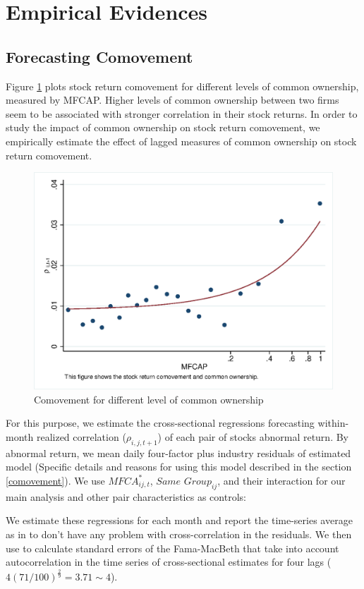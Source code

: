 
\section{Empirical Evidences}



\subsection{{Forecasting Comovement}}
\label{Forecasting Comovement}

	Figure \ref{mcorr50} plots stock return comovement for different levels of common ownership, measured by MFCAP.  Higher levels of common	ownership between two firms seem to be associated with stronger correlation in their stock returns. In order to study the impact of common ownership on stock return comovement, we empirically estimate the effect of lagged measures of common ownership on stock return comovement. 
	\begin{figure}[htbp]
	\centering  
	\centering
	\includegraphics[width=0.7\linewidth]{"Output/mcorr50.eps"} 
	\caption{Comovement for different level of common ownership }
	\label{mcorr50}
\end{figure}
	
	For this purpose, we estimate the cross-sectional regressions forecasting within-month realized correlation ($\rho_{i,j,t+1}$) of each pair of stocks abnormal return. By abnormal return, we mean daily four-factor plus industry residuals of estimated model (Specific details and reasons for using this model described in the section \ref{comovement}). We use $\textit{MFCA}^*_{ij,t}$, $\textit{Same Group}_{ij} $, and their interaction for our main analysis and other pair characteristics as controls:
		

	
	We estimate these regressions for each month and report the time-series average as in \cite{FamaMacBeth} to don't have any problem with cross-correlation in the residuals. We then use  \cite{newey1987hypothesis} to calculate standard errors of the Fama-MacBeth that take into account autocorrelation in the time series of cross-sectional estimates for four lags ($ 4(71/100)^{\frac{2}{9}} = 3.71 \sim 4 $).
	
